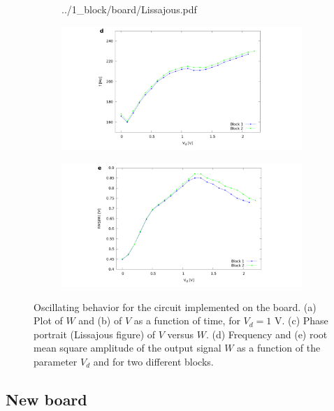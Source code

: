 \documentclass[a4paper,11pt,aps,secnumarabic,balancelastpage,amsmath,amssymb,floatfix,table]{article}
\begin{document}
\begin{figure}[H]
\begin{subfigure}{.39\textwidth}
        {../1_block/board/Lissajous.pdf}
    \end{subfigure}
    \begin{subfigure}{.49\textwidth}
        \includegraphics[width=\linewidth,trim={10cm 0 9cm 0},clip,left]
        {../1_block/board/freq_board.pdf}
    \end{subfigure}
    \begin{subfigure}{.49\textwidth}
        \centering
        \includegraphics[width=\linewidth,trim={9cm 0 10cm 0},clip,right]
        {../1_block/board/rms_board.pdf}
    \end{subfigure}
    \caption{Oscillating behavior for the circuit implemented on
    the board. (a) Plot of $W$ and (b) of $V$ as a
    function of time, for $V_d=1$ V.
    (c) Phase portrait (Lissajous figure) of $V$ versus $W$. (d)
    Frequency and (e) root mean square amplitude of the
    output signal $W$ as a function of the parameter $V_d$ and for
    two different blocks.}
    \label{fig:oscillation board}
\end{figure}


\subsection{New board}\label{sec:new board}
\end{document}
